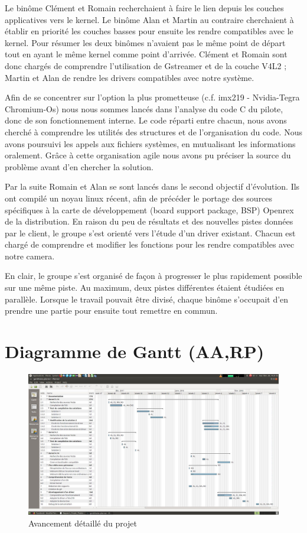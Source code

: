 Le binôme Clément et Romain recherchaient à faire le lien depuis les couches applicatives
vers le kernel. Le binôme Alan et Martin au contraire cherchaient à établir en priorité les
couches basses pour ensuite les rendre compatibles avec le kernel.
Pour résumer les deux binômes n’avaient pas le même point de départ tout en ayant le
même kernel comme point d’arrivée. Clément et Romain sont donc chargés de
comprendre l’utilisation de Gstreamer et de la couche V4L2 ; Martin et Alan de rendre les
drivers compatibles avec notre système.  \medskip

Afin de se concentrer sur l’option la plus prometteuse (c.f. imx219 - Nvidia-Tegra
Chromium-Os) nous nous sommes lancés dans l’analyse du code C du pilote, donc
de son fonctionnement interne. Le code réparti entre chacun, nous avons cherché à
comprendre les utilités des structures et de l’organisation du code. Nous
avons poursuivi les appels aux fichiers systèmes, en mutualisant les informations
oralement. Grâce à cette organisation agile nous avons pu préciser la source du problème
avant d’en chercher la solution.  \medskip

Par la suite Romain et Alan se sont lancés dans le second objectif d’évolution. Ils ont
compilé un noyau linux récent, afin de précéder le portage des sources spécifiques à la
carte de développement (board support package, BSP) Openrex de la distribution.
En raison du peu de résultats et des nouvelles pistes données par le client, le groupe s’est
orienté vers l’étude d’un driver existant. Chacun est chargé de comprendre et modifier les
fonctions pour les rendre compatibles avec notre camera.  \medskip

En clair, le groupe s'est organisé de façon à progresser le plus rapidement possible sur
une même piste. Au maximum, deux pistes différentes étaient étudiées en parallèle.
Lorsque le travail pouvait être divisé, chaque binôme s’occupait d’en prendre une partie
pour ensuite tout remettre en commun.

\section{Diagramme de Gantt (AA,RP)}

\begin{figure}[!htb]
    \centering
    \includegraphics[angle=90,trim={2.5cm 2cm 0cm 3.5cm},clip,scale=0.35]{Figures/gantt.png}
    \decoRule
    \caption{Avancement détaillé du projet} \label{fig:planning}
\end{figure}

